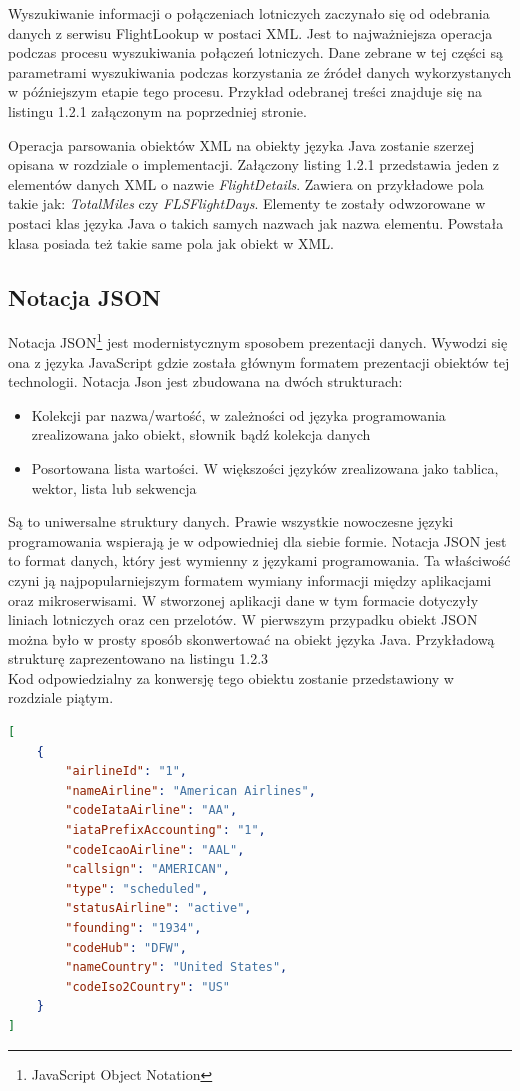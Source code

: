 \documentclass[12pt, twoside]{report}
\begin{document}
Wyszukiwanie informacji o połączeniach lotniczych zaczynało się od odebrania danych z serwisu FlightLookup w postaci XML. Jest to najważniejsza operacja podczas procesu wyszukiwania połączeń lotniczych. Dane zebrane w tej części są parametrami wyszukiwania podczas korzystania ze źródeł danych wykorzystanych w późniejszym etapie tego procesu. Przykład odebranej treści znajduje się na listingu 1.2.1 załączonym na poprzedniej stronie.

Operacja parsowania obiektów XML na obiekty języka Java zostanie szerzej opisana w rozdziale o implementacji. Załączony listing 1.2.1 przedstawia jeden z elementów danych XML o nazwie \textit{FlightDetails}. Zawiera on przykładowe pola takie jak: \textit{TotalMiles} czy \textit{FLSFlightDays}. Elementy te zostały odwzorowane w postaci klas języka Java o takich samych nazwach jak nazwa elementu. Powstała klasa posiada też takie same pola jak obiekt w XML.

\subsection{Notacja JSON}
Notacja JSON\footnote{JavaScript Object Notation} jest modernistycznym sposobem prezentacji danych. Wywodzi się ona z języka JavaScript gdzie została głównym formatem prezentacji obiektów tej technologii. Notacja Json jest zbudowana na dwóch strukturach:
\begin{itemize}[noitemsep,topsep=0pt]
\item Kolekcji par nazwa/wartość, w zależności od języka programowania zrealizowana jako obiekt, słownik bądź kolekcja danych
\item Posortowana lista wartości. W większości języków zrealizowana jako tablica, wektor, lista lub sekwencja
\end{itemize}
Są to uniwersalne struktury danych. Prawie wszystkie nowoczesne języki programowania wspierają je w odpowiedniej dla siebie formie. Notacja JSON jest to format danych, który jest wymienny z językami programowania. Ta właściwość czyni ją najpopularniejszym formatem wymiany informacji między aplikacjami oraz mikroserwisami\cite{json}. W stworzonej aplikacji dane w tym formacie dotyczyły liniach lotniczych oraz cen przelotów. W pierwszym przypadku obiekt JSON można było w prosty sposób skonwertować na obiekt języka Java. Przykładową strukturę zaprezentowano na listingu 1.2.3\\
Kod odpowiedzialny za konwersję tego obiektu zostanie przedstawiony w rozdziale piątym.
\begin{lstlisting}[language=JSON, caption= Przykładowy obiekt w notacji JSON]
   [
    {
        "airlineId": "1",
        "nameAirline": "American Airlines",
        "codeIataAirline": "AA",
        "iataPrefixAccounting": "1",
        "codeIcaoAirline": "AAL",
        "callsign": "AMERICAN",
        "type": "scheduled",
        "statusAirline": "active",
        "founding": "1934",
        "codeHub": "DFW",
        "nameCountry": "United States",
        "codeIso2Country": "US"
    }
]
\end{lstlisting}
\end{document}
